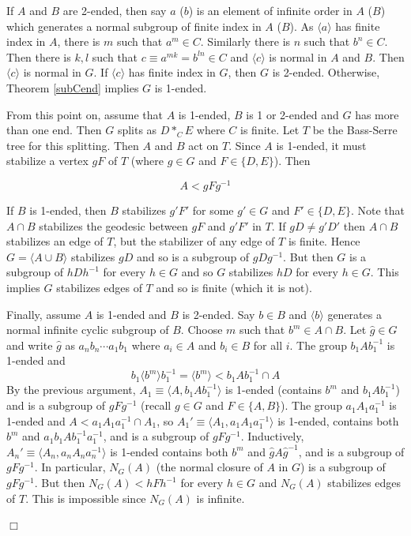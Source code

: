 \documentclass[12pt]{article}
\newenvironment{proof}{\addvspace{12pt}\noindent{\bf Proof:}}{
$\Box$\par\addvspace{12pt}}
\begin{document}
\begin{proof}
If $A$ and $B$ are 2-ended, then say $a$ ($b$) is an element of infinite order in $A$ ($B$) which generates a normal subgroup of finite index in $A$ ($B$). As $\langle a\rangle$ has finite index in $A$, there is $m$ such that $a^m\in C$. Similarly there is $n$ such that $b^n\in C$. Then there is $k,l$ such that $c\equiv a^{mk}= b^{ln}\in C$ and $\langle c\rangle$ is normal in $A$ and $B$. Then $\langle c\rangle$ is normal in $G$. If $\langle c\rangle$ has finite index in $G$, then $G$ is 2-ended. Otherwise, Theorem \ref{subCend} implies $G$ is 1-ended. 

From this point on, assume that $A$ is 1-ended, $B$ is 1 or 2-ended and $G$ has more than one end. Then $G$ splits as $D\ast_CE$ where $C$ is finite. Let $T$ be the Bass-Serre tree for this splitting. Then $A$ and $B$ act on $T$. Since $A$ is 1-ended, it must stabilize a vertex $gF$ of $T$ (where $g\in G$ and $F\in \{D, E\}$). Then 

$$A <gFg^{-1}$$ 

If $B$ is 1-ended, then $B$ stabilizes $g'F'$ for some $g'\in G$ and $F'\in \{D,E\}$. Note that $A\cap B$ stabilizes the geodesic between $gF$ and $g'F'$ in $T$. If $gD\ne g'D'$ then $A\cap B$ stabilizes an edge of $T$, but the stabilizer of any edge of $T$ is finite. Hence $G=\langle A\cup B\rangle$ stabilizes $gD$ and so is a subgroup of $gDg^{-1}$. But then $G$ is a subgroup of $hDh^{-1}$ for every $h\in G$ and so $G$ stabilizes $hD$ for every $h\in G$. This implies $G$ stabilizes edges of $T$ and so is finite (which it is not). 


Finally, assume $A$ is 1-ended and $B$ is 2-ended. Say $b\in B$ and $\langle b\rangle$ generates a normal infinite cyclic subgroup of $B$. Choose $m$ such that $b^m\in A\cap B$.  Let $\hat g\in G$ and write $\hat g$ as $a_nb_n\cdots a_1b_1$ where $a_i\in A$ and $b_i\in B$ for all $i$. The group $b_1Ab_1^{-1}$ is 1-ended and 
$$b_1\langle b^m\rangle b_1^{-1}=\langle b^m\rangle<b_1Ab_1^{-1}\cap A$$ 
By the previous argument, $A_1\equiv \langle A, b_1Ab_1^{-1}\rangle$ is 1-ended (contains $b^m$ and $b_1Ab_1^{-1}$) and is a subgroup of $gFg^{-1}$ (recall $g\in G$ and $F\in \{A,B\}$). The group $a_1A_1a_1^{-1}$ is 1-ended and $A<a_1A_1a_1^{-1}\cap A_1$,  so $A_1'\equiv \langle A_1, a_1A_1a_1^{-1}\rangle$ is 1-ended, contains both $b^m$ and $a_1b_1Ab_1^{-1}a_1^{-1}$, and is a subgroup of $gFg^{-1}$. Inductively, $A_n'\equiv \langle A_n,a_nA_na_n^{-1}\rangle$ is 1-ended contains both $b^m$ and $\hat gA\hat g^{-1}$, and is a subgroup of $gFg^{-1}$. In particular, $N_G(A)$ (the normal closure of $A$ in $G$) is a subgroup of $gFg^{-1}$. But then $N_G(A)<hFh^{-1}$ for every $h\in G$ and $N_G(A)$ stabilizes edges of $T$. This is impossible since $N_G(A)$ is infinite.
\end{proof}
\end{document}

